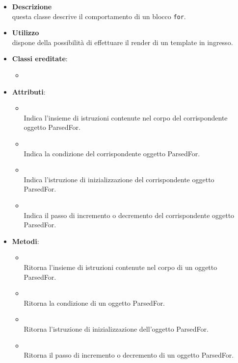 \begin{itemize}
\item \textbf{Descrizione}\\
questa classe descrive il comportamento di un blocco \texttt{for}.
\item \textbf{Utilizzo}\\
dispone della possibilità di effettuare il render di un template in ingresso.
\item \textbf{Classi ereditate}:
\begin{itemize}
\item \hyperref[\nogloxy{swedesigner::server::project::ParsedInstruction}]{}
\end{itemize}
\item \textbf{Attributi}:
\begin{itemize}
\item {}
\\ Indica l'insieme di istruzioni contenute nel corpo del corrispondente oggetto ParsedFor.
\item {}
\\ Indica la condizione del corrispondente oggetto ParsedFor.
\item {}
\\ Indica l'istruzione di inizializzazione del corrispondente oggetto ParsedFor.
\item {}
\\ Indica il passo di incremento o decremento del corrispondente oggetto ParsedFor.
\end{itemize}
\item \textbf{Metodi}:
\begin{itemize}
\item {}
\\ Ritorna l'insieme di istruzioni contenute nel corpo di un oggetto ParsedFor.
\item {}
\\ Ritorna la condizione di un oggetto ParsedFor.
\item {}
\\ Ritorna l'istruzione di inizializzazione dell'oggetto ParsedFor.
\item {}
\\ Ritorna il passo di incremento o decremento di un oggetto ParsedFor.

\end{itemize}
\end{itemize}
